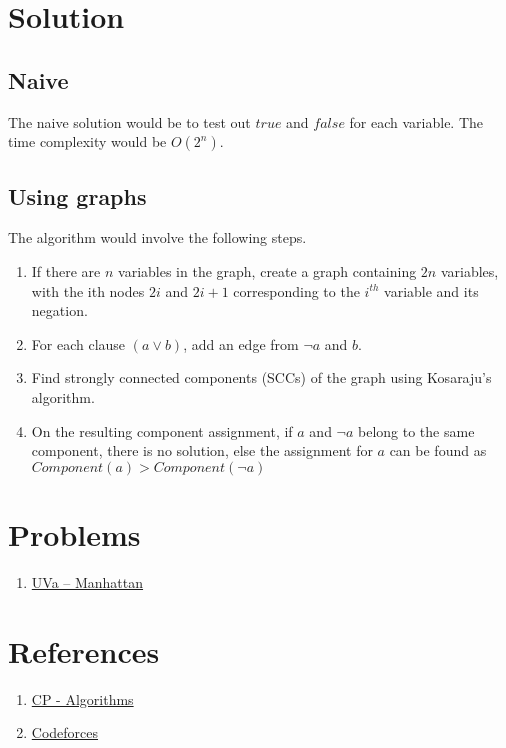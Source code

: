 \documentclass[titlepage, 12pt]{article}
\begin{document}
	\section{Solution}
	
	\subsection{Naive}
	
	The naive solution would be to test out $true$ and $false$ for each variable. The time complexity would be $ O(2^n) $.

	\subsection{Using graphs}

	The algorithm would involve the following steps.

	\begin{enumerate}

	\item If there are $n$ variables in the graph, create a graph containing $2n$ variables, with the ith nodes $2i$ and $2i+1$ corresponding to the $i^{th}$ variable and its negation.
	
	\item For each clause $(a \lor b)$, add an edge from $\lnot a$ and $b$.
	
	\item Find strongly connected components (SCCs) of the graph using Kosaraju's algorithm.
	
	\item On the resulting component assignment, if $a$ and $\lnot a$ belong to the same component, there is no solution, else the assignment for $a$ can be found as $Component(a) > Component(\lnot a)$
	
	\end{enumerate}
			
	\section{Problems}
	
	\begin{enumerate}
	
	\item \href{https://onlinejudge.org/index.php?option=onlinejudge&page=show_problem&problem=1260}{UVa -- Manhattan}
	
	\end{enumerate}
	
	\section{References}
	
	\begin{enumerate}
	
	\item \href{https://cp-algorithms.com/graph/2SAT.html}{CP - Algorithms}
	
	\item \href{https://codeforces.com/blog/entry/16205}{Codeforces}
	
	\end{enumerate}
	
\end{document}
